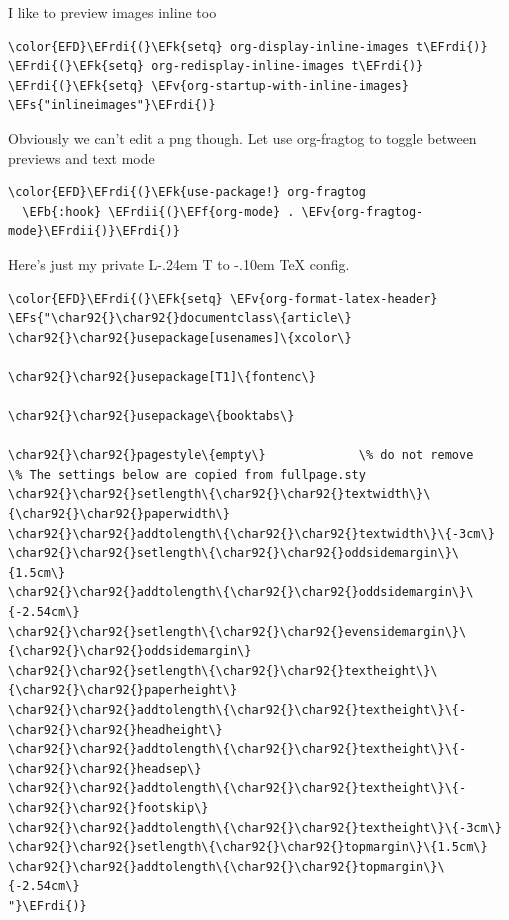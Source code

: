 \documentclass{scrartcl}
\makeatletter
\DeclareRobustCommand{\LaTeX}{L\kern-.24em%
        {\sbox\z@ T%
         \vbox to\ht\z@{\hbox{\check@mathfonts
                              \fontsize\sf@size\z@
                              \math@fontsfalse\selectfont
                              A}%
                        \vss}%
        }%
        \kern-.10em%
        \TeX}
\newcommand{\EFk}[1]{\textcolor{EFk}{#1}} %
\newcommand{\EFs}[1]{\textcolor{EFs}{#1}} %
\newcommand{\EFb}[1]{\textcolor{EFb}{#1}} %
\newcommand{\EFv}[1]{\textcolor{EFv}{#1}} %
\newcommand{\EFf}[1]{\textcolor{EFf}{#1}} %
\newcommand{\EFrdi}[1]{#1} %
\newcommand{\EFrdii}[1]{#1} %
\makeatother
\begin{document}
I like to preview images inline too
\begin{Code}
\begin{Verbatim}[]
\color{EFD}\EFrdi{(}\EFk{setq} org-display-inline-images t\EFrdi{)}
\EFrdi{(}\EFk{setq} org-redisplay-inline-images t\EFrdi{)}
\EFrdi{(}\EFk{setq} \EFv{org-startup-with-inline-images} \EFs{"inlineimages"}\EFrdi{)}
\end{Verbatim}
\end{Code}

Obviously we can't edit a png though. Let use org-fragtog to toggle between previews and text mode
\begin{Code}
\begin{Verbatim}[]
\color{EFD}\EFrdi{(}\EFk{use-package!} org-fragtog
  \EFb{:hook} \EFrdii{(}\EFf{org-mode} . \EFv{org-fragtog-mode}\EFrdii{)}\EFrdi{)}
\end{Verbatim}
\end{Code}

Here's just my private \LaTeX{} config.
\begin{Code}
\begin{Verbatim}[]
\color{EFD}\EFrdi{(}\EFk{setq} \EFv{org-format-latex-header} \EFs{"\char92{}\char92{}documentclass\{article\}
\char92{}\char92{}usepackage[usenames]\{xcolor\}

\char92{}\char92{}usepackage[T1]\{fontenc\}

\char92{}\char92{}usepackage\{booktabs\}

\char92{}\char92{}pagestyle\{empty\}             \% do not remove
\% The settings below are copied from fullpage.sty
\char92{}\char92{}setlength\{\char92{}\char92{}textwidth\}\{\char92{}\char92{}paperwidth\}
\char92{}\char92{}addtolength\{\char92{}\char92{}textwidth\}\{-3cm\}
\char92{}\char92{}setlength\{\char92{}\char92{}oddsidemargin\}\{1.5cm\}
\char92{}\char92{}addtolength\{\char92{}\char92{}oddsidemargin\}\{-2.54cm\}
\char92{}\char92{}setlength\{\char92{}\char92{}evensidemargin\}\{\char92{}\char92{}oddsidemargin\}
\char92{}\char92{}setlength\{\char92{}\char92{}textheight\}\{\char92{}\char92{}paperheight\}
\char92{}\char92{}addtolength\{\char92{}\char92{}textheight\}\{-\char92{}\char92{}headheight\}
\char92{}\char92{}addtolength\{\char92{}\char92{}textheight\}\{-\char92{}\char92{}headsep\}
\char92{}\char92{}addtolength\{\char92{}\char92{}textheight\}\{-\char92{}\char92{}footskip\}
\char92{}\char92{}addtolength\{\char92{}\char92{}textheight\}\{-3cm\}
\char92{}\char92{}setlength\{\char92{}\char92{}topmargin\}\{1.5cm\}
\char92{}\char92{}addtolength\{\char92{}\char92{}topmargin\}\{-2.54cm\}
"}\EFrdi{)}
\end{Verbatim}
\end{Code}
\end{document}
